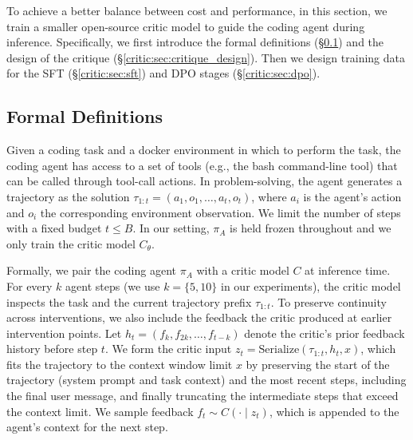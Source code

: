 To achieve a better balance between cost and performance, in this section, we train a smaller open-source critic model to guide the coding agent during inference.
Specifically, we first introduce the formal definitions (\S\ref{critic:sec:critic_models}) and the design of the critique (\S\ref{critic:sec:critique_design}). Then we design training data for the SFT (\S\ref{critic:sec:sft}) and DPO stages (\S\ref{critic:sec:dpo}).

\subsection{Formal Definitions}
\label{critic:sec:critic_models}
Given a coding task and a docker environment in which to perform the task, the coding agent has access to a set of tools (e.g., the bash command-line tool) that can be called through tool-call actions.
In problem-solving, the agent generates a trajectory as the solution 
$\tau_{1:t} = (a_1, o_1, \ldots, a_t, o_t)$,
where $a_i$ is the agent's action and $o_i$ the corresponding environment observation.
We limit the number of steps with a fixed budget $t \leq B$.
In our setting, $\pi_A$ is held frozen throughout and we only train the critic model $C_\theta$. 


Formally, we pair the coding agent $\pi_A$ with a critic model $C$ at inference time.
For every $k$ agent steps (we use $k=\{5,10\}$ in our experiments), the critic model inspects the task and the current trajectory prefix $\tau_{1:t}$. 
To preserve continuity across interventions, we also include the feedback the critic produced at earlier intervention points. Let $h_t = (f_k, f_{2k}, \ldots, f_{t-k})$ denote the critic's prior feedback history before step $t$. We form the critic input $z_t = \mathrm{Serialize}(\tau_{1:t}, h_t, x)$, which fits the trajectory to the context window limit $x$ by preserving the start of the trajectory (system prompt and task context) and the most recent steps, including the final user message, and finally truncating the intermediate steps that exceed the context limit.
We sample feedback $f_t \sim C(\cdot \mid z_t)$, which is appended to the agent's context for the next step.


